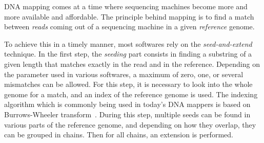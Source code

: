 DNA mapping comes at a time where sequencing machines become more and more available and affordable. The principle behind mapping is to find a match between \emph{reads} coming out of a sequencing machine in a given \emph{reference} genome. 

To achieve this in a timely manner, most softwares rely on the \emph{seed-and-extend} technique. In the first step, the \emph{seeding} part consists in finding a substring of a given length that matches exactly in the read and in the reference. Depending on the parameter used in various softwares, a maximum of zero, one, or several mismatches can be allowed. For this step, it is necessary to look into the whole genome for a match, and an index of the reference genome is used. The indexing algorithm which is commonly being used in today's DNA mappers is based on Burrows-Wheeler transform~\cite{BurrowsWheeler:align}. During this step, multiple seeds can be found in various parts of the reference genome, and depending on how they overlap, they can be grouped in chains. Then for all chains, an extension is performed.


